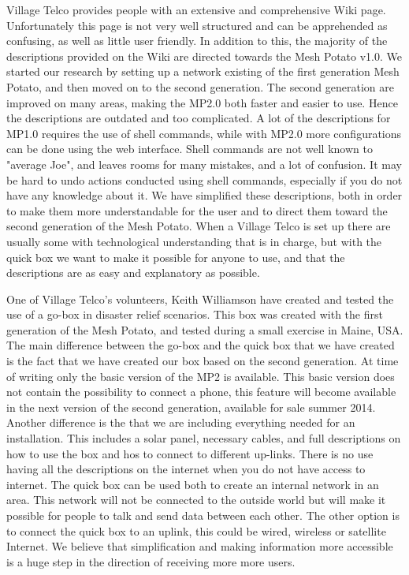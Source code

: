 Village Telco provides people with an extensive and comprehensive Wiki page. Unfortunately this page is not very well structured and can be apprehended as confusing, as well as little user friendly. In addition to this, the majority of the descriptions provided on the Wiki are directed towards the Mesh Potato v1.0. We started our research by setting up a network existing of the first generation Mesh Potato, and then moved on to the second generation. The second generation are improved on many areas, making the MP2.0 both faster and easier to use. Hence the descriptions are outdated and too complicated. A lot of the descriptions for MP1.0 requires the use of shell commands, while with MP2.0 more configurations can be done using the web interface. Shell commands are not well known to "average Joe", and leaves rooms for many mistakes, and a lot of confusion. It may be hard to undo actions conducted using shell commands, especially if you do not have any knowledge about it. We have simplified these descriptions, both in order to make them more understandable for the user and to direct them toward the second generation of the Mesh Potato. When a Village Telco is set up there are usually some with technological understanding that is in charge, but with the \gls{quick} box we want to make it possible for anyone to use, and that the descriptions are as easy and explanatory as possible. 


One of Village Telco's volunteers, Keith Williamson have created and tested the use of a go-box in disaster relief scenarios. This box was created with the first generation of the Mesh Potato, and tested during a small exercise in Maine, USA. The main difference between the go-box and the \gls{quick} box that we have created is the fact that we have created our box based on the second generation. At time of writing only the basic version of the MP2 is available. This basic version does not contain the possibility to connect a phone, this feature will become available in the next version of the second generation, available for sale summer 2014. Another difference is the that we are including everything needed for an installation. This includes a solar panel, necessary cables, and full descriptions on how to use the box and hos to connect to different up-links. There is no use having all the descriptions on the internet when you do not have access to internet. The \gls{quick} box can be used both to create an internal network in an area. This network will not be connected to the outside world but will make it possible for people to talk and send data between each other. The other option is to connect the \gls{quick} box to an uplink, this could be wired, wireless or satellite Internet. We believe that simplification and making information more accessible is a huge step in the direction of receiving more more users. 

